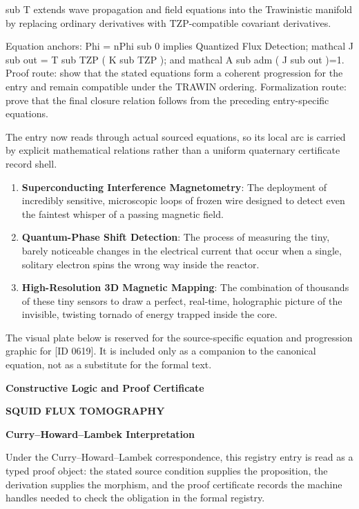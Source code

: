 sub T extends wave propagation and field equations into the Trawinistic manifold by replacing ordinary derivatives with TZP-compatible covariant derivatives.

Equation anchors: Phi = nPhi sub 0 implies Quantized Flux Detection; mathcal J sub out = T sub TZP ( K sub TZP ); and mathcal A sub adm ( J sub out )=1. Proof route: show that the stated equations form a coherent progression for the entry and remain compatible under the TRAWIN ordering. Formalization route: prove that the final closure relation follows from the preceding entry-specific equations.

The entry now reads through actual sourced equations, so its local arc is carried by explicit mathematical relations rather than a uniform quaternary certificate record shell.
\endgroup

\begin{enumerate}[leftmargin=1.6em,itemsep=6pt,topsep=4pt]
\item \textbf{Superconducting Interference Magnetometry}: The deployment of incredibly sensitive, microscopic loops of frozen wire designed to detect even the faintest whisper of a passing magnetic field.
\item \textbf{Quantum-Phase Shift Detection}: The process of measuring the tiny, barely noticeable changes in the electrical current that occur when a single, solitary electron spins the wrong way inside the reactor.
\item \textbf{High-Resolution 3D Magnetic Mapping}: The combination of thousands of these tiny sensors to draw a perfect, real-time, holographic picture of the invisible, twisting tornado of energy trapped inside the core.
\end{enumerate}

\begingroup\footnotesize\sloppy
The visual plate below is reserved for the source-specific equation and progression graphic for [ID 0619]. It is included only as a companion to the canonical equation, not as a substitute for the formal text.
\par\endgroup
\ifTZPDarkEdition
{}
\fi

\clearpage
\begingroup\tzpsupportsetup
\noindent\textbf{\fontsize{10.8pt}{12.8pt}\selectfont [ID 0619] Constructive Logic and Proof Certificate}\par
\noindent\textbf{\fontsize{10pt}{12pt}\selectfont SQUID FLUX TOMOGRAPHY}\par
\vspace{0.45em}
\begingroup
\footnotesize
\setlength{\parskip}{0.22em}
\setlength{\parindent}{0pt}
\noindent\textbf{Curry--Howard--Lambek Interpretation}\par
Under the Curry--Howard--Lambek correspondence, this registry entry is read as a typed proof
object: the stated source condition supplies the proposition, the derivation supplies the
morphism, and the proof certificate records the machine handles needed to check the obligation
in the formal registry.

